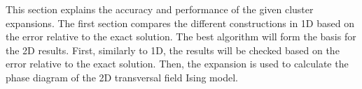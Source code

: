 This section explains the accuracy and performance of the given cluster expansions. The first section compares the different constructions in 1D based on the error relative to the exact solution. The best algorithm will form the basis for the 2D results. First, similarly to 1D, the results will be checked based on the error relative to the exact solution. Then, the expansion is used to calculate the phase diagram of the 2D transversal field Ising model.